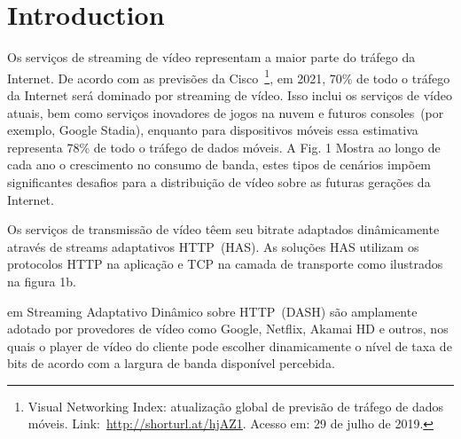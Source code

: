 \section{Introduction}
\label{ch:introduction}



Os serviços de streaming de vídeo representam a maior parte do tráfego da Internet. De acordo com as previsões da Cisco~\footnote{Visual Networking Index: atualização global de previsão de tráfego de dados móveis. Link:~\url{http://shorturl.at/hjAZ1}. Acesso em: 29 de julho de 2019.}, em 2021, 70\% de todo o tráfego da Internet será dominado por streaming de vídeo. Isso inclui os serviços de vídeo atuais, bem como serviços inovadores de jogos na nuvem e futuros consoles~(por exemplo, Google Stadia), enquanto para dispositivos móveis essa estimativa representa 78\% de todo o tráfego de dados móveis. A Fig. 1 Mostra ao longo de cada ano o crescimento no consumo de banda, estes tipos de cenários impõem significantes desafios para a distribuição de vídeo sobre as futuras gerações da Internet.


Os serviços de transmissão de vídeo têem seu bitrate adaptados dinâmicamente através de streams adaptativos HTTP~(HAS). As soluções HAS utilizam os protocolos HTTP na aplicação e TCP na camada de transporte como ilustrados na figura 1b. 

em Streaming Adaptativo Dinâmico sobre HTTP~(DASH) são amplamente adotado por provedores de vídeo como Google, Netflix, Akamai HD e outros, nos quais o player de vídeo do cliente pode escolher dinamicamente o nível de taxa de bits de acordo com a largura de banda disponível percebida.

